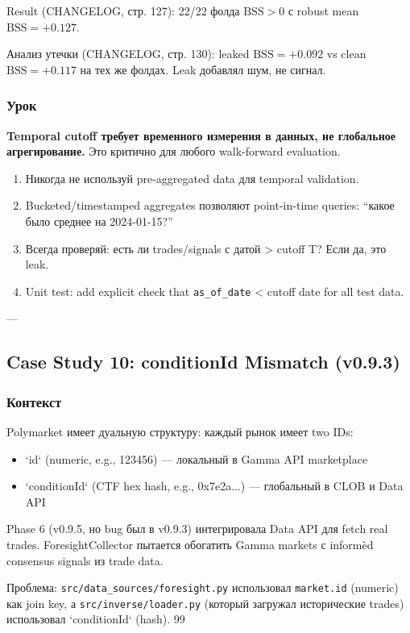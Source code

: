 Result (CHANGELOG, стр. 127): 22/22 фолда $\text{BSS} > 0$ с robust mean $\text{BSS} = +0.127$.

Анализ утечки (CHANGELOG, стр. 130): leaked $\text{BSS} = +0.092$ vs clean $\text{BSS} = +0.117$ на тех же фолдах. Leak добавлял шум, не сигнал.

\subsubsection*{Урок}
\textbf{Temporal cutoff требует временного измерения в данных, не глобальное агрегирование.} Это критично для любого walk-forward evaluation.

\begin{enumerate}
\item Никогда не используй pre-aggregated data для temporal validation.
\item Bucketed/timestamped aggregates позволяют point-in-time queries: ``какое было среднее на 2024-01-15?''
\item Всегда проверяй: есть ли trades/signals с датой > cutoff T? Если да, это leak.
\item Unit test: add explicit check that \texttt{as\_of\_date} < cutoff date for all test data.
\end{enumerate}

---

\subsection{Case Study 10: conditionId Mismatch (v0.9.3)}

\subsubsection*{Контекст}
Polymarket имеет дуальную структуру: каждый рынок имеет two IDs:
\begin{itemize}
\item `id` (numeric, e.g., 123456) --- локальный в Gamma API marketplace
\item `conditionId` (CTF hex hash, e.g., 0x7e2a...) --- глобальный в CLOB и Data API
\end{itemize}

Phase 6 (v0.9.5, но bug был в v0.9.3) интегрировала Data API для fetch real trades. ForesightCollector пытается обогатить Gamma markets с informèd consensus signals из trade data.

Проблема: \texttt{src/data\_sources/foresight.py} использовал \texttt{market.id} (numeric) как join key, а \texttt{src/inverse/loader.py} (который загружал исторические trades) использовал `conditionId` (hash). 99%

